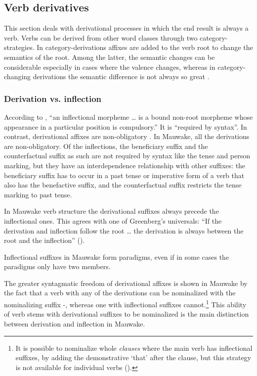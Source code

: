 \subsection{Verb derivatives}\label{sec:3.8.2}
{}
This section deals with derivational processes in which the end result is always a verb. Verbs can be derived from other word classes through two category- strategies. In category-derivations affixes are added to the verb root to change the semantics of the root. Among the latter, the semantic changes can be considerable especially in cases where the valence changes, whereas in category-changing derivations the semantic difference is not always so great \citep[83]{Bybee1985}. 

\subsubsection{Derivation vs. inflection}
{}
According to \citet[81]{Bybee1985}, ``{an inflectional morpheme {\dots} is a bound non-root morpheme whose appearance in a particular position is compulsory}.'' It is ``{required by syntax}''. In contrast, derivational affixes are non-obligatory \citep[191]{Greenberg1954}. In Mauwake, all the derivations are non-obligatory. Of the inflections, the beneficiary suffix and the counterfactual suffix as such are not required by syntax like the tense and person marking, but they have an interdependence relationship with other suffixes: the beneficiary suffix has to occur in a past tense or imperative form of a verb that also has the benefactive suffix, and the counterfactual suffix restricts the tense marking to past tense.

In Mauwake verb structure the derivational suffixes always precede the inflectional ones. This agrees with one of {Greenberg}'s universals: ``{If the derivation and inflection follow the root {\dots} the derivation is always between the root and the inflection}'' (\citeyear[93]{Greenberg1966}).

Inflectional suffixes in Mauwake form paradigms, even if in some cases the paradigms only have two members.

The greater syntagmatic freedom of derivational affixes \citep[128--129]{Malkiel1978} is shown in Mauwake by the fact that a verb with any of the derivations can be nominalized with the nominalizing suffix \nobreakdash-, whereas one with inflectional suffixes cannot.\footnote{It is possible to nominalize whole \textit{clauses} where the main verb has inflectional suffixes, by adding the demonstrative  `that' after the clause, but this strategy is not available for individual verbs ().} This ability of verb stems with derivational suffixes to be nominalized is the main distinction between derivation and inflection in Mauwake. 


